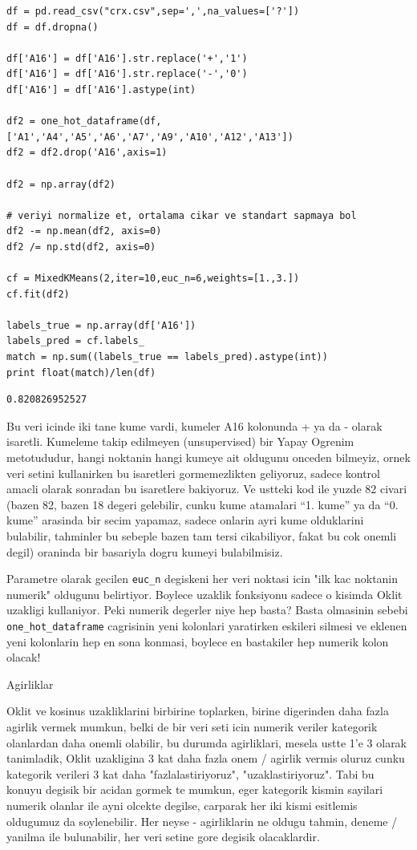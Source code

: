 \documentclass[12pt,fleqn]{article}\usepackage{../common}
\begin{document}
\begin{verbatim}
df = pd.read_csv("crx.csv",sep=',',na_values=['?'])
df = df.dropna()

df['A16'] = df['A16'].str.replace('+','1')
df['A16'] = df['A16'].str.replace('-','0')
df['A16'] = df['A16'].astype(int)

df2 = one_hot_dataframe(df,['A1','A4','A5','A6','A7','A9','A10','A12','A13'])
df2 = df2.drop('A16',axis=1)

df2 = np.array(df2)

# veriyi normalize et, ortalama cikar ve standart sapmaya bol
df2 -= np.mean(df2, axis=0)
df2 /= np.std(df2, axis=0)

cf = MixedKMeans(2,iter=10,euc_n=6,weights=[1.,3.])
cf.fit(df2)

labels_true = np.array(df['A16'])
labels_pred = cf.labels_
match = np.sum((labels_true == labels_pred).astype(int))
print float(match)/len(df)
\end{verbatim}

\begin{verbatim}
0.820826952527
\end{verbatim}

Bu veri icinde iki tane kume vardi, kumeler A16 kolonunda + ya da - olarak
isaretli. Kumeleme takip edilmeyen (unsupervised) bir Yapay Ogrenim
metotududur, hangi noktanin hangi kumeye ait oldugunu onceden bilmeyiz,
ornek veri setini kullanirken bu isaretleri gormemezlikten geliyoruz,
sadece kontrol amacli olarak sonradan bu isaretlere bakiyoruz. Ve ustteki
kod ile yuzde 82 civari (bazen 82, bazen 18 degeri gelebilir, cunku kume
atamalari ``1. kume'' ya da ``0. kume'' arasinda bir secim yapamaz, sadece
onlarin ayri kume olduklarini bulabilir, tahminler bu sebeple bazen tam
tersi cikabiliyor, fakat bu cok onemli degil) oraninda bir basariyla dogru
kumeyi bulabilmisiz.

Parametre olarak gecilen \verb!euc_n! degiskeni her veri noktasi icin "ilk
kac noktanin numerik" oldugunu belirtiyor. Boylece uzaklik fonksiyonu
sadece o kisimda Oklit uzakligi kullaniyor. Peki numerik degerler niye hep
basta?  Basta olmasinin sebebi \verb!one_hot_dataframe! cagrisinin yeni
kolonlari yaratirken eskileri silmesi ve eklenen yeni kolonlarin hep en
sona konmasi, boylece en bastakiler hep numerik kolon olacak!

Agirliklar

Oklit ve kosinus uzakliklarini birbirine toplarken, birine digerinden
daha fazla agirlik vermek mumkun, belki de bir veri seti icin numerik
veriler kategorik olanlardan daha onemli olabilir, bu durumda
agirliklari, mesela ustte 1'e 3 olarak tanimladik, Oklit uzakligina 3
kat daha fazla onem / agirlik vermis oluruz cunku kategorik verileri 3
kat daha "fazlalastiriyoruz", "uzaklastiriyoruz". Tabi bu konuyu
degisik bir acidan gormek te mumkun, eger kategorik kismin sayilari
numerik olanlar ile ayni olcekte degilse, carparak her iki kismi
esitlemis oldugumuz da soylenebilir. Her neyse - agirliklarin ne
oldugu tahmin, deneme / yanilma ile bulunabilir, her veri setine gore
degisik olacaklardir.
\end{document}
